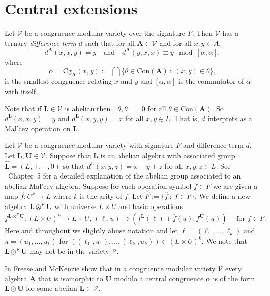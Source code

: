 \documentclass[12pt]{amsart}
\numberwithin{equation}{section}
\theoremstyle{plain}
\theoremstyle{definition}
\newcommand{\st}{\ :\ }
\newcommand{\A}{\mathbf{A}}
\renewcommand{\L}{\mathbf{L}}
\newcommand{\U}{\mathbf{U}}
\newcommand{\V}{\mathcal{V}}
\newcommand{\Con}{\mathrm{Con}}
\newcommand{\Cg}{\mathrm{Cg}}
\begin{document}

\section{Central extensions} 
\label{sec:centralextensions}

Let $\V$ be a congruence modular variety over the signature $F$. 
Then $\V$ has a ternary \emph{difference term} $d$ 
  such that for all $\A\in \V$ and for all $x,y\in A$,
  \[ d^\A(x,x,y) = y  \quad \text{and} \quad  d^\A(y,x,x) \equiv y \mod [\alpha,\alpha], \]
  where
  \[ \alpha = \Cg_\A(x,y) := \bigcap \{\theta \in \Con(\A) \st (x,y) \in \theta\},\]
  is the smallest congruence relating $x$ and $y$ and $[\alpha,\alpha]$ is the commutator 
  of $\alpha$ with itself. 

Note that if $\L \in \V$ is abelian then $[\theta, \theta] = 0$ for all $\theta \in \Con(\A)$.
So $d^\L(x,x,y) = y$ and $d^\L(x,y,y) = x$ for all $x,y \in L.$ 
That is, $d$ interprets as a Mal'cev operation on $\L$. 
 
Let $\V$ be a congruence modular variety with signature $F$ and difference term $d$. 
Let $\L, \U \in \V$. Suppose that $\L$ is an abelian algebra with associated group 
  $\hat{\L} = (L, +, -, 0)$ 
  so that $d^\L(x,y,z) = x-y+z$ for all $x,y,z \in L$. 
See \cite{FM:CTC}~Chapter~5 for a detailed explanation of the abelian group associated 
  to an abelian Mal'cev algebra.
Suppose for each operation symbol $f \in F$ we are given a map $\hat{f} \colon U^k \rightarrow L$ 
  where $k$ is the arity of $f$. 
Let $\hat{F} := \{\hat{f} \st f \in F\}$. We define a new algebra $\L \otimes^{\hat{F}} \U$ 
  with universe $L \times U$ and basic operations 
  \[f^{\L \otimes^{\hat{F}} \U} \colon (L \times U)^k \rightarrow L \times U, \, (\ell, u) \mapsto (f^\L(\ell) + \hat{f}(u), f^\U(u)) \quad \text{ for } f \in F. \]
Here and throughout we slightly abuse notation and let $\ell = (\ell_1,\dots,\ell_k)$ 
  and $u = (u_1,\dots,u_k)$ for $( (\ell_1,u_1),\dots,(\ell_k,u_k) ) \in (L\times U)^k$.
We note that $\L \otimes^{\hat{F}} \U$ may not be in the variety $\V$. 
 
In \cite{FM:CTC} Freese and McKenzie show that in a congruence modular variety $\V$ every algebra $\A$
  that is isomorphic to $\U$ modulo a central congruence $\alpha$ is of the form $\L\otimes\U$ 
  for some abelian $\L\in \V$.
 
\end{document}
